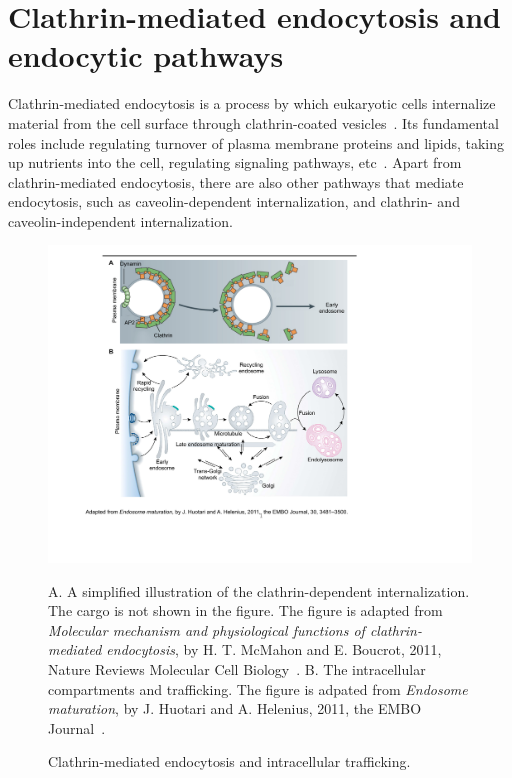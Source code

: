 \section{Clathrin-mediated endocytosis and endocytic pathways}
Clathrin-mediated endocytosis is a process by which eukaryotic cells internalize material from the cell surface through clathrin-coated vesicles~\cite{McMahon}. Its fundamental roles include regulating turnover of plasma membrane proteins and lipids, taking up nutrients into the cell, regulating signaling pathways, etc~\cite{McMahon,Humphries}. Apart from clathrin-mediated endocytosis, there are also other pathways that mediate endocytosis, such as caveolin-dependent internalization, and clathrin- and caveolin-independent internalization.
\begin{figure}[h]
\centering
\includegraphics[scale=0.7]{Figures/endocytosis}
\caption{Clathrin-mediated endocytosis and intracellular trafficking.}
\vspace*{-3mm}
\small \justify
A. A simplified illustration of the clathrin-dependent internalization. The cargo is not shown in the figure. The figure is adapted from \textit{Molecular mechanism and physiological functions of clathrin-mediated endocytosis}, by H. T. McMahon and E. Boucrot, 2011, Nature Reviews Molecular Cell Biology~\cite{McMahon}. B. The intracellular compartments and trafficking. The figure is adpated from \textit{Endosome maturation}, by J. Huotari and A. Helenius, 2011, the EMBO Journal~\cite{Huotari}. 
\label{fig:endocytosis}
\end{figure}

